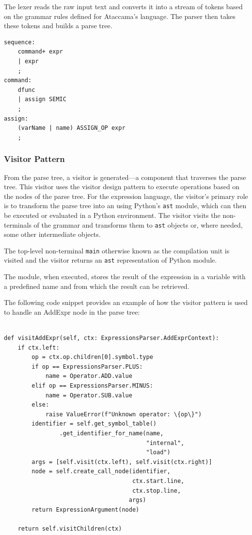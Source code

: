 The lexer reads the raw input text and converts it into a stream of tokens based on the grammar rules defined for Ataccama’s language. The parser then takes these tokens and builds a parse tree.

\begin{verbatim}
sequence:
    command+ expr
    | expr
    ;
command:
    dfunc
    | assign SEMIC
    ;
assign:
    (varName | name) ASSIGN_OP expr
    ;
\end{verbatim}

\subsubsection{Visitor Pattern}
 From the parse tree, a visitor is generated—a component that traverses the parse tree. This visitor uses the visitor design pattern to execute operations based on the nodes of the parse tree. For the expression language, the visitor's primary role is to transform the parse tree into an   using Python’s \texttt{ast} module, which can then be executed or evaluated in a Python environment. The visitor visits the non-terminals of the grammar and transforms them to \texttt{ast} objects or, where needed, some other intermediate objects.

The top-level non-terminal \texttt{main} otherwise known as the compilation unit is visited and the visitor returns an \texttt{ast} representation of Python module.

The module, when executed, stores the result of the expression in a variable with a predefined name and from which the result can be retrieved.

The following code snippet provides an example of how the visitor pattern is used to handle an AddExpr node in the parse tree:

\begin{verbatim}
    
def visitAddExpr(self, ctx: ExpressionsParser.AddExprContext):
    if ctx.left:
        op = ctx.op.children[0].symbol.type
        if op == ExpressionsParser.PLUS:
            name = Operator.ADD.value
        elif op == ExpressionsParser.MINUS:
            name = Operator.SUB.value
        else:
            raise ValueError(f"Unknown operator: \{op\}")
        identifier = self.get_symbol_table()
                .get_identifier_for_name(name,
                                         "internal",
                                         "load")
        args = [self.visit(ctx.left), self.visit(ctx.right)]
        node = self.create_call_node(identifier, 
                                     ctx.start.line,
                                     ctx.stop.line,
                                    args)
        return ExpressionArgument(node)

    return self.visitChildren(ctx)

\end{verbatim}

